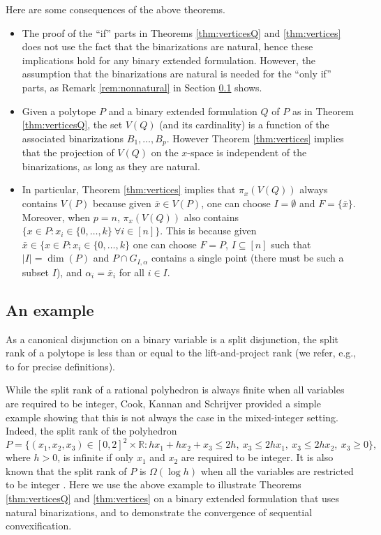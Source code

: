 \documentclass[11pt,a4paper]{article}
\newcommand{\R}{\mathbb{R}}
\newcommand{\1}{\textbf{1}}
\begin{document}
Here are some consequences of the above theorems.
\begin{itemize}
\item The proof of the ``if'' parts in Theorems \ref{thm:verticesQ} and \ref{thm:vertices}  does not use the fact that the binarizations are natural, hence these implications hold for any binary extended formulation. However, the assumption that the binarizations are natural is needed for the ``only if'' parts, as Remark \ref{rem:nonnatural} in Section \ref{sec:example} shows. 
\item Given a polytope $P$ and a binary extended formulation $Q$ of $P$ as in Theorem \ref{thm:verticesQ},  the set $V(Q)$ (and its cardinality)  is a function of the associated binarizations $B_1,\dots, B_p$. However Theorem \ref{thm:vertices} implies that the projection of $V(Q)$ on the $x$-space is independent of the  binarizations, as long as they are natural. 
    \item     In particular, Theorem \ref{thm:vertices} implies that $\pi_x(V(Q))$ always contains $V(P)$ because given  $\bar x\in V(P)$, one can choose $I=\emptyset$ and $F=\{\bar x\}$. Moreover, when $p=n$,  $\pi_x(V(Q))$ also contains $\{x\in P: x_i\in \{0,\dots,k\} \:\forall i\in[n]\}$. This is because given $\bar x\in \{x\in P: x_i\in \{0,\dots,k\}$ one can choose $F=P$, $I\subseteq[n]$ such that $|I|=\dim(P)$ and $P\cap G_{I,\alpha}$ contains a single point (there must be such a subset $I$), and $\alpha_i=\bar{x}_i$ for all $i\in I$.
\end{itemize}





\subsection{An example}\label{sec:example}

 As a canonical disjunction on a binary variable is a split disjunction, the split rank of a polytope is less than or equal to the lift-and-project rank (we refer, e.g., to \cite{conforti2014integer} for precise definitions).

While the split rank of a rational polyhedron is always finite when all variables are required to be integer,
Cook, Kannan and Schrijver \cite{cook-kannan-schrijver} provided a simple example showing that this is not always the case in the mixed-integer setting. Indeed, the split rank of the polyhedron 
\begin{equation}\label{eq:pyramid}
P=\{(x_1,x_2,x_3)\in [0,2]^2\times \R:  hx_1+hx_2+x_3\leq 2h,\:
    x_3\leq 2h x_1,\:
    x_3\leq 2h x_2,\:
    x_3\ge 0
     \},
\end{equation}
where $h>0$, is infinite if only $x_1$ and $x_2$ are required to be integer. It is also known that the split rank of $P$ is $\Omega(\log h)$ when all the variables are restricted to be integer \cite{reverse-chatal}.
Here we use the above example to illustrate Theorems \ref{thm:verticesQ} and \ref{thm:vertices} on a binary extended formulation that uses natural binarizations, and to demonstrate the convergence of sequential convexification.
\end{document}
